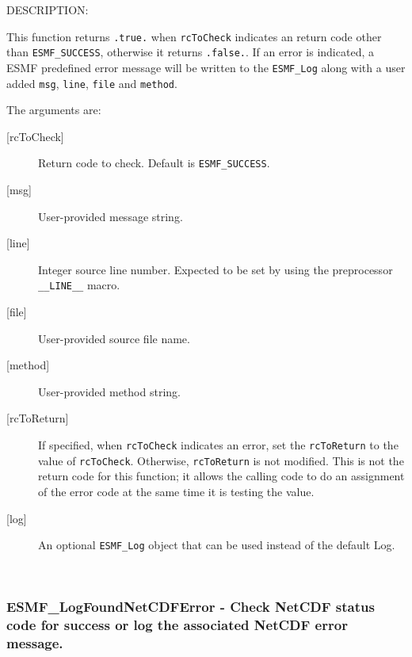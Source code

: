 {\sf DESCRIPTION:\\ }


        This function returns {\tt .true.} when {\tt rcToCheck} indicates
        an return code other than {\tt ESMF\_SUCCESS}, otherwise it returns
        {\tt .false.}.
        If an error is indicated, a ESMF predefined error message
        will be written to the {\tt ESMF\_Log} along with a user added {\tt msg},
        {\tt line}, {\tt file} and {\tt method}.
  
        The arguments are:
        \begin{description}
  
        \item [{[rcToCheck]}]
              Return code to check. Default is {\tt ESMF\_SUCCESS}.
        \item [{[msg]}]
              User-provided message string.
        \item [{[line]}]
              Integer source line number.  Expected to be set by
              using the preprocessor {\tt \_\_LINE\_\_} macro.
        \item [{[file]}]
              User-provided source file name.
        \item [{[method]}]
              User-provided method string.
        \item [{[rcToReturn]}]
              If specified, when {\tt rcToCheck} indicates an error,
              set the {\tt rcToReturn} to the value of {\tt rcToCheck}.
              Otherwise, {\tt rcToReturn} is not modified.
              This is not the return code for this function; it allows
              the calling code to do an assignment of the error code
              at the same time it is testing the value.
        \item [{[log]}]
              An optional {\tt ESMF\_Log} object that can be used instead
              of the default Log.
  
        \end{description}
   
 
\mbox{}\hrulefill\ 
 
\subsubsection [ESMF\_LogFoundNetCDFError] {ESMF\_LogFoundNetCDFError - Check NetCDF status code for success or log the associated NetCDF error message.}


